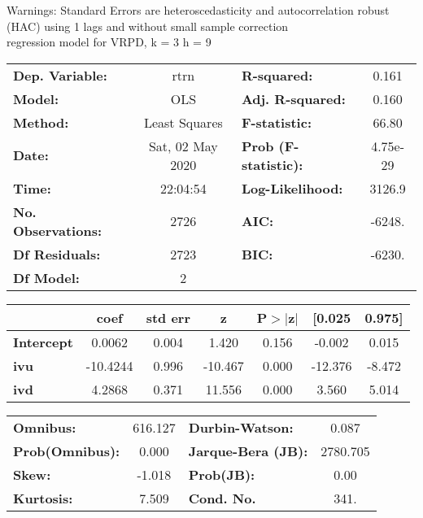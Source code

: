 Warnings: \newline
 [1] Standard Errors are heteroscedasticity and autocorrelation robust (HAC) using 1 lags and without small sample correction\\ 

regression model for VRPD, k = 3 h = 9\begin{center}
\begin{tabular}{lclc}
\toprule
\textbf{Dep. Variable:}    &       rtrn       & \textbf{  R-squared:         } &     0.161   \\
\textbf{Model:}            &       OLS        & \textbf{  Adj. R-squared:    } &     0.160   \\
\textbf{Method:}           &  Least Squares   & \textbf{  F-statistic:       } &     66.80   \\
\textbf{Date:}             & Sat, 02 May 2020 & \textbf{  Prob (F-statistic):} &  4.75e-29   \\
\textbf{Time:}             &     22:04:54     & \textbf{  Log-Likelihood:    } &    3126.9   \\
\textbf{No. Observations:} &        2726      & \textbf{  AIC:               } &    -6248.   \\
\textbf{Df Residuals:}     &        2723      & \textbf{  BIC:               } &    -6230.   \\
\textbf{Df Model:}         &           2      & \textbf{                     } &             \\
\bottomrule
\end{tabular}
\begin{tabular}{lcccccc}
                   & \textbf{coef} & \textbf{std err} & \textbf{z} & \textbf{P$> |$z$|$} & \textbf{[0.025} & \textbf{0.975]}  \\
\midrule
\textbf{Intercept} &       0.0062  &        0.004     &     1.420  &         0.156        &       -0.002    &        0.015     \\
\textbf{ivu}       &     -10.4244  &        0.996     &   -10.467  &         0.000        &      -12.376    &       -8.472     \\
\textbf{ivd}       &       4.2868  &        0.371     &    11.556  &         0.000        &        3.560    &        5.014     \\
\bottomrule
\end{tabular}
\begin{tabular}{lclc}
\textbf{Omnibus:}       & 616.127 & \textbf{  Durbin-Watson:     } &    0.087  \\
\textbf{Prob(Omnibus):} &   0.000 & \textbf{  Jarque-Bera (JB):  } & 2780.705  \\
\textbf{Skew:}          &  -1.018 & \textbf{  Prob(JB):          } &     0.00  \\
\textbf{Kurtosis:}      &   7.509 & \textbf{  Cond. No.          } &     341.  \\
\bottomrule
\end{tabular}
\end{center}

